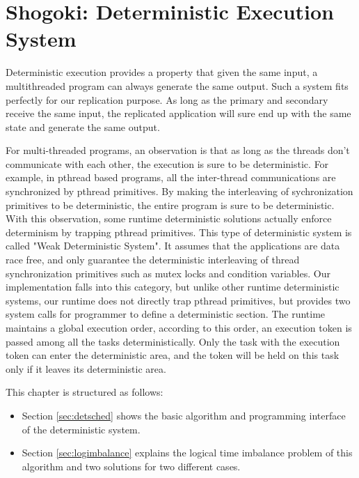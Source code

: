 \chapter{Shogoki: Deterministic Execution System} \label{chap:detexec}
Deterministic execution provides a property that given the same input, a multithreaded program can always generate the same output. Such a system fits perfectly for our replication purpose. As long as the primary and secondary receive the same input, the replicated application will sure end up with the same state and generate the same output.

For multi-threaded programs, an observation is that as long as the threads don't communicate with each other, the execution is sure to be deterministic\cite{devietti2009dmp}. For example, in pthread based programs, all the inter-thread communications are synchronized by pthread primitives. By making the interleaving of sychronization primitives to be deterministic, the entire program is sure to be deterministic. With this observation, some runtime deterministic solutions actually enforce determinism by trapping pthread primitives\cite{cui2013parrot}\cite{liu2011dthreads}\cite{olszewski2009kendo}. This type of deterministic system is called "Weak Deterministic System". It assumes that the applications are data race free, and only guarantee the deterministic interleaving of thread synchronization primitives such as mutex locks and condition variables. Our implementation falls into this category, but unlike other runtime deterministic systems, our runtime does not directly trap pthread primitives, but provides two system calls for programmer to define a deterministic section. The runtime maintains a global execution order, according to this order, an execution token is passed among all the tasks deterministically. Only the task with the execution token can enter the deterministic area, and the token will be held on this task only if it leaves its deterministic area.

This chapter is structured as follows:
\begin{itemize}
\item Section \ref{sec:detsched} shows the basic algorithm and programming interface of the deterministic system.
\item Section \ref{sec:logimbalance} explains the logical time imbalance problem of this algorithm and two solutions for two different cases.
\end{itemize}

